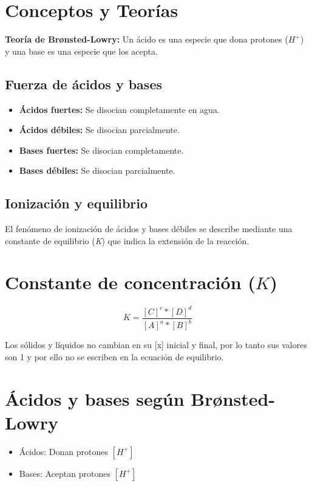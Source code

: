 \section{Conceptos y Teorías}

    \textbf{Teoría de Brønsted-Lowry:} Un ácido es una especie que dona protones ($H^{+}$) y una base es una especie que los acepta.


\subsection{Fuerza de ácidos y bases}
\begin{itemize}
    \item \textbf{Ácidos fuertes:} Se disocian completamente en agua.
    \item \textbf{Ácidos débiles:} Se disocian parcialmente.
    \item \textbf{Bases fuertes:} Se disocian completamente.
    \item \textbf{Bases débiles:} Se disocian parcialmente.
\end{itemize}

\subsection{Ionización y equilibrio}
El fenómeno de ionización de ácidos y bases débiles se describe mediante una constante de equilibrio (\textit{K}) que indica la extensión de la reacción.

\section{Constante de concentración ($K$)}

\begin{equation*}
    K=\frac {[C]^c*[D]^d}{[A]^a*[B]^b}
\end{equation*}

Los sólidos y líquidos no cambian en su [x] inicial y final, por lo tanto sus valores son 1 y por ello no se escriben en la ecuación de equilibrio.

\section{Ácidos y bases según Brønsted-Lowry}

\begin{itemize}
    \item Ácidos: Donan protones $[H^{+}]$
    \item Bases: Aceptan protones $[H^{+}]$ 
\end{itemize}


